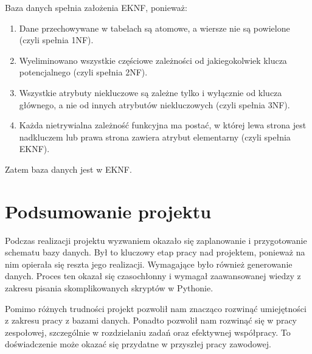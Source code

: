 \documentclass{article}
\begin{document}
	Baza danych spełnia założenia EKNF, ponieważ:
	\begin{enumerate}
		\item Dane przechowywane w tabelach są atomowe, a wiersze nie są powielone (czyli spełnia 1NF).
		\item Wyeliminowano wszystkie częściowe zależności od jakiegokolwiek klucza potencjalnego (czyli spełnia 2NF).
		\item Wszystkie atrybuty niekluczowe są zależne tylko i wyłącznie od klucza głównego, a nie od innych atrybutów niekluczowych (czyli spełnia 3NF).
		\item Każda nietrywialna zależność funkcyjna ma postać, w której lewa strona jest nadkluczem lub prawa strona zawiera atrybut elementarny (czyli spełnia EKNF).
	\end{enumerate}
	
	Zatem baza danych jest w EKNF.
	
	\section{Podsumowanie projektu}
	
	Podczas realizacji projektu wyzwaniem okazało się zaplanowanie i przygotowanie schematu bazy danych. Był to kluczowy etap pracy nad projektem, ponieważ na nim opierała się reszta jego realizacji. Wymagające było również generowanie danych. Proces ten okazał się czasochłonny i wymagał zaawansowanej wiedzy z zakresu pisania skomplikowanych skryptów w Pythonie.
	
	Pomimo różnych trudności projekt pozwolił nam znacząco rozwinąć umiejętności z zakresu pracy z bazami danych. Ponadto pozwolił nam rozwinąć się w pracy zespołowej, szczególnie w rozdzielaniu zadań oraz efektywnej współpracy. To doświadczenie może okazać się przydatne w przyszłej pracy zawodowej.
	
\end{document}
